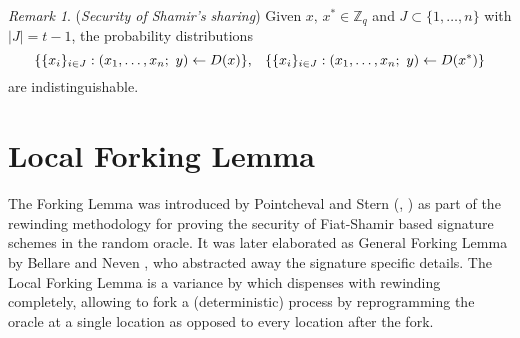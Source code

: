 \documentclass[10pt, psamsfonts, reqno]{amsart}
\theoremstyle{definition}
\theoremstyle{remark}
\newtheorem{rem}[thm]{Remark}
\numberwithin{equation}{section}
\begin{document}
\begin{rem}\label{shamir_security}
(\textit{Security of Shamir's sharing})
Given $x,\hspace{2pt} x^* \in \mathbb{Z}_q$ and
$J \subset \{1, \dots, n\}$ with $|J| = t - 1$,
the probability distributions
\vspace{5pt}
\begin{equation*}
\{\{x_i\}_{i \in J}:
(x_1, \dots, x_n;\ y) \leftarrow D(x)\},
\hspace{8pt}
\{\{x_i\}_{i \in J}:
(x_1, \dots, x_n;\ y) \leftarrow D(x^*)\}
\vspace{5pt}
\end{equation*}
are indistinguishable.
\end{rem}

\section{Local Forking Lemma}\label{section_local_forking_lemma}

\noindent
The Forking Lemma was introduced by
Pointcheval and Stern
(\cite{paper_pointcheval_stern_1}, \cite{paper_pointcheval_stern_2})
as part of the rewinding methodology for proving
the security of Fiat-Shamir based signature schemes
in the random oracle. It was later elaborated as
General Forking Lemma by Bellare and Neven
\cite{paper_bellare_musig}, who
abstracted away the signature specific details.
The Local Forking Lemma is a variance
by \cite{paper_bellare_local_forking}
which dispenses with rewinding completely,
allowing to fork a (deterministic) process
by reprogramming the oracle at a single location
as opposed to every location after the fork.
\end{document}
